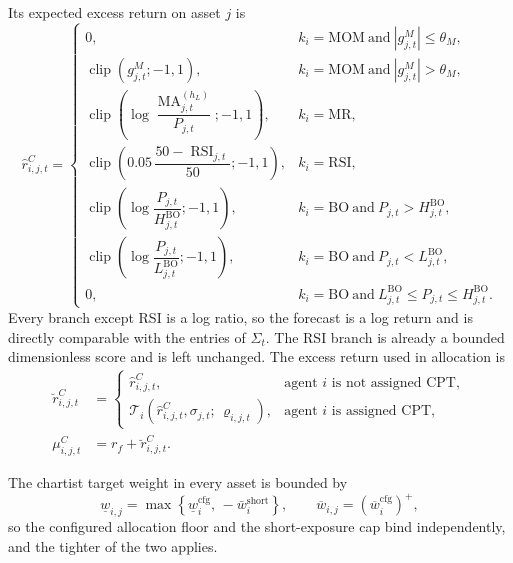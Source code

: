 \documentclass[12pt, a4paper]{article}
\DeclareMathOperator{\clip}{clip}
\DeclareMathOperator{\MA}{MA}
\DeclareMathOperator{\RSI}{RSI}
\newcommand{\pospart}[1]{\left(#1\right)^{+}}
\begin{document}
    Its expected excess return on asset \(j\) is
    \[
        \hat r_{i,j,t}^{C}=
        \begin{cases}
            0, & k_i=\mathrm{MOM}\ \text{and}\ |g_{j,t}^M|\le\theta_M,\\[1ex]
            \clip\!\left(g_{j,t}^M;-1,1\right), & k_i=\mathrm{MOM}\ \text{and}\ |g_{j,t}^M|>\theta_M,\\[1ex]
            \clip\!\left(\log\dfrac{\MA_{j,t}^{(h_L)}}{P_{j,t}};-1,1\right), & k_i=\mathrm{MR},\\[1ex]
            \clip\!\left(0.05\,\dfrac{50-\RSI_{j,t}}{50};-1,1\right), & k_i=\mathrm{RSI},\\[1ex]
            \clip\!\left(\log\dfrac{P_{j,t}}{H_{j,t}^{\mathrm{BO}}};-1,1\right), & k_i=\mathrm{BO}\ \text{and}\ P_{j,t}>H_{j,t}^{\mathrm{BO}},\\[1ex]
            \clip\!\left(\log\dfrac{P_{j,t}}{L_{j,t}^{\mathrm{BO}}};-1,1\right), & k_i=\mathrm{BO}\ \text{and}\ P_{j,t}<L_{j,t}^{\mathrm{BO}},\\[1ex]
            0, & k_i=\mathrm{BO}\ \text{and}\ L_{j,t}^{\mathrm{BO}}\le P_{j,t}\le H_{j,t}^{\mathrm{BO}}.
        \end{cases}
    \]
    Every branch except RSI is a log ratio, so the forecast is a log return and is
    directly comparable with the entries of \(\Sigma_t\). The RSI branch is already
    a bounded dimensionless score and is left unchanged.
    The excess return used in allocation is
    \begin{align*}
        \breve r_{i,j,t}^{C}&=
        \begin{cases}
            \hat r_{i,j,t}^{C}, & \text{agent } i \text{ is not assigned CPT},\\
            \mathcal{T}_i\!\left(\hat r_{i,j,t}^{C},\sigma_{j,t};\,\varrho_{i,j,t}\right), & \text{agent } i \text{ is assigned CPT},
        \end{cases}
        \\
        \mu_{i,j,t}^{C}&=r_f+\breve r_{i,j,t}^{C}.
    \end{align*}

    The chartist target weight in every asset is bounded by
    \[
        \underline w_{i,j}=\max\left\{\underline w_i^{\text{cfg}},\,-\bar w_i^{\text{short}}\right\},
        \qquad
        \overline w_{i,j}=\pospart{\overline w_i^{\text{cfg}}},
    \]
    so the configured allocation floor and the short-exposure cap bind
    independently, and the tighter of the two applies.
\end{document}

